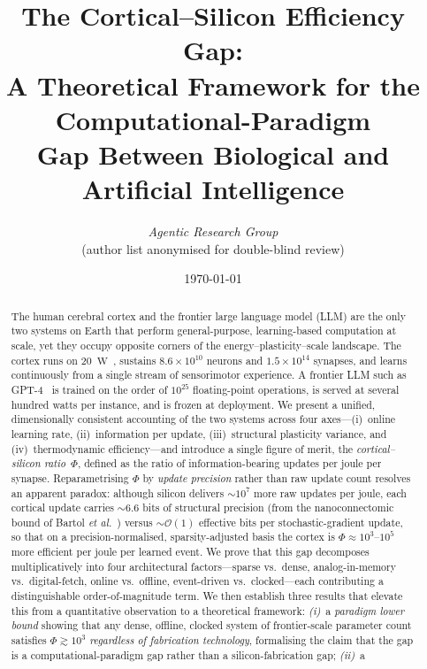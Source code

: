 \documentclass[11pt]{article}
\title{The Cortical--Silicon Efficiency Gap:\\
       A Theoretical Framework for the Computational-Paradigm\\
       Gap Between Biological and Artificial Intelligence}
\author{%
  \textit{Agentic Research Group}\\
  \small (author list anonymised for double-blind review)
}
\date{\today}
\providecommand{\watt}{\ensuremath{\mathrm{W}}}
\theoremstyle{definition}
\theoremstyle{remark}
\begin{document}
\maketitle

\begin{abstract}
  The human cerebral cortex and the frontier large language model
  (LLM) are the only two systems on Earth that perform general-purpose,
  learning-based computation at scale, yet they occupy opposite
  corners of the energy--plasticity--scale landscape.  The cortex runs
  on \SI{20}{\watt}~\cite{brainfacts2019energy}, sustains
  $8.6\times 10^{10}$ neurons and $1.5\times 10^{14}$ synapses, and
  learns continuously from a single stream of sensorimotor experience.
  A frontier LLM such as GPT-4~\cite{openai2023gpt4} is trained on the
  order of $10^{25}$ floating-point operations, is served at several
  hundred watts per instance, and is frozen at deployment.  We present
  a unified, dimensionally consistent accounting of the two systems
  across four axes---(i)~online learning rate, (ii)~information per
  update, (iii)~structural plasticity variance, and
  (iv)~thermodynamic efficiency---and introduce a single figure of
  merit, the \emph{cortical--silicon ratio}~$\Phi$, defined as the
  ratio of information-bearing updates per joule per synapse.
  Reparametrising $\Phi$ by \emph{update precision} rather than raw
  update count resolves an apparent paradox: although silicon delivers
  $\sim\!10^{7}$ more raw updates per joule, each cortical update
  carries $\sim\!6.6$ bits of structural precision (from the
  nanoconnectomic bound of Bartol \emph{et
  al.}~\cite{bartol2015nanoconnectomic}) versus $\sim\!\mathcal{O}(1)$
  effective bits per stochastic-gradient update, so that on a
  precision-normalised, sparsity-adjusted basis the cortex is
  $\Phi\approx 10^{3}$--$10^{5}$ more efficient per joule per learned
  event.  We prove that this gap decomposes multiplicatively into four
  architectural factors---sparse vs.\ dense, analog-in-memory vs.\
  digital-fetch, online vs.\ offline, event-driven vs.\ clocked---each
  contributing a distinguishable order-of-magnitude term.  We then
  establish three results that elevate this from a quantitative
  observation to a theoretical framework: \emph{(i)}~a \emph{paradigm
  lower bound} showing that any dense, offline, clocked system of
  frontier-scale parameter count satisfies
  $\Phi\gtrsim 10^{3}$ \emph{regardless of fabrication technology},
  formalising the claim that the gap is a computational-paradigm gap
  rather than a silicon-fabrication gap; \emph{(ii)}~a

\end{abstract}
\end{document}
